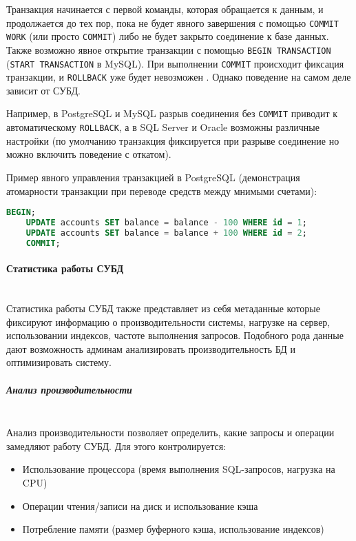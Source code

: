 Транзакция начинается с первой команды, которая обращается к данным, и продолжается до тех пор, пока не будет явного завершения с помощью \texttt{COMMIT WORK} (или просто \texttt{COMMIT}) либо не будет закрыто соединение к базе данных. Также возможно явное открытие транзакции с помощью \texttt{BEGIN TRANSACTION} (\texttt{START TRANSACTION} в MySQL). При выполнении \texttt{COMMIT} происходит фиксация транзакции, и \texttt{ROLLBACK} уже будет невозможен \autocite{Pirogov2009}. Однако поведение на самом деле зависит от СУБД.

Например, в PostgreSQL и MySQL разрыв соединения без \texttt{COMMIT} приводит к автоматическому \texttt{ROLLBACK}, а в SQL Server и Oracle возможны различные настройки (по умолчанию транзакция фиксируется при разрыве соединение но можно включить поведение с откатом).

Пример явного управления транзакцией в PostgreSQL (демонстрация атомарности транзакции при переводе средств между мнимыми счетами):
\begin{lstlisting}[language=SQL]
    BEGIN;
    UPDATE accounts SET balance = balance - 100 WHERE id = 1;
    UPDATE accounts SET balance = balance + 100 WHERE id = 2;
    COMMIT;           
\end{lstlisting}


\paragraph{Статистика работы СУБД} ~\\

Статистика работы СУБД также представляет из себя метаданные которые фиксируют информацию о производительности системы, нагрузке на сервер, использовании индексов, частоте выполнения запросов. Подобного рода данные дают возможность админам анализировать производительность БД и оптимизировать систему.

\subparagraph{Анализ производительности} ~\\

Анализ производительности позволяет определить, какие запросы и операции замедляют работу СУБД. Для этого контролируется:
\begin{itemize}
    \item Использование процессора (время выполнения SQL-запросов, нагрузка на CPU)
    \item Операции чтения/записи на диск и использование кэша
    \item Потребление памяти (размер буферного кэша, использование индексов)
\end{itemize}

